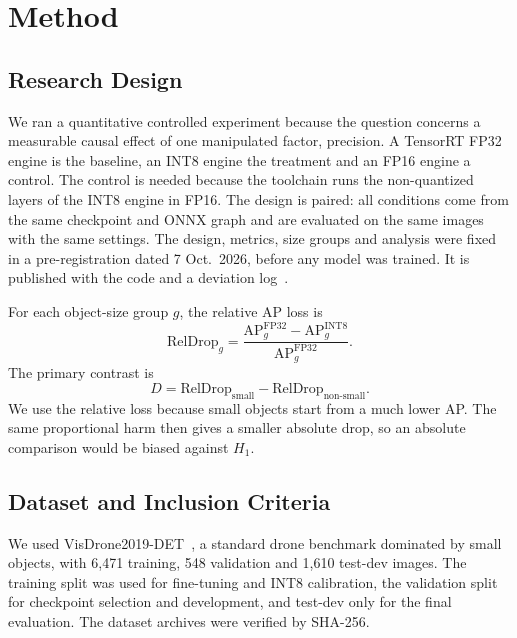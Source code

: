 \documentclass[conference]{IEEEtran}
\begin{document}
\section{Method}
\label{sec:method}

\subsection{Research Design}
We ran a quantitative controlled experiment because the question concerns a measurable causal
effect of one manipulated factor, precision. A TensorRT FP32 engine is the baseline, an INT8 engine the
treatment and an FP16 engine a control. The control is needed because the toolchain runs the
non-quantized layers of the INT8 engine in FP16. The design is paired: all conditions come from
the same checkpoint and ONNX graph and are evaluated on the same images with the same settings.
The design, metrics, size groups and analysis were fixed in a pre-registration dated 7 Oct.\
2026, before any model was trained. It is published with the code and a deviation
log~\cite{hussaini2026researchmethodology}.

For each object-size group $g$, the relative AP loss is
\begin{equation}
\mathrm{RelDrop}_{g} =
\frac{\mathrm{AP}^{\mathrm{FP32}}_{g} - \mathrm{AP}^{\mathrm{INT8}}_{g}}
{\mathrm{AP}^{\mathrm{FP32}}_{g}}.
\label{eq:relative-ap-drop}
\end{equation}
The primary contrast is
\begin{equation}
D = \mathrm{RelDrop}_{\mathrm{small}} - \mathrm{RelDrop}_{\mathrm{non\text{-}small}}.
\label{eq:size-interaction}
\end{equation}
We use the relative loss because small objects start from a much lower AP. The same proportional
harm then gives a smaller absolute drop, so an absolute comparison would be biased against $H_1$.

\subsection{Dataset and Inclusion Criteria}
We used VisDrone2019-DET~\cite{zhu2022visdrone}, a standard drone benchmark dominated by small
objects, with 6,471 training, 548 validation and 1,610
test-dev images. The training split was used for fine-tuning and INT8 calibration, the validation
split for checkpoint selection and development, and test-dev only for the final evaluation. The
dataset archives were verified by SHA-256.
\end{document}
